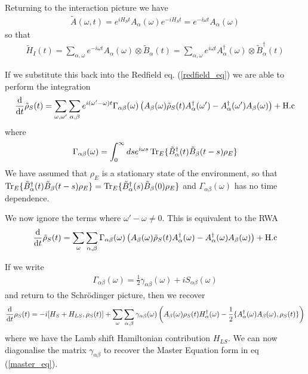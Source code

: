 Returning to the interaction picture we have
\begin{align}
  \tilde{A}(\omega, t) = e^{iH_S t}A_\alpha(\omega) e^{-iH_S t} = e^{-i\omega t} A_\alpha(\omega)
\end{align}
so that
\begin{align}
  \tilde{H}_I(t) = \sum_{\alpha, \omega} e^{-i \omega t} A_\alpha(\omega)\otimes \tilde{B}_\alpha(t) = \sum_{\alpha, \omega} e^{i \omega t} A^\dagger_\alpha(\omega)\otimes \tilde{B}^\dagger_\alpha(t)
\end{align}

If we substitute this back into the Redfield eq. (\ref{redfield_eq}) we are able to perform the integration
\begin{align}
  \frac{\mathrm{d}}{\mathrm{d}t} \tilde{\rho}_S(t) = \sum_{\omega, \omega'} \sum_{\alpha, \beta} e^{i(\omega'-\omega)t} \Gamma_{\alpha\beta}(\omega)\left(A_\beta(\omega)\tilde{\rho}_S(t)A^\dagger_\alpha(\omega') - A^\dagger_\alpha(\omega')A_\beta(\omega)\right) + \text{H.c}
\end{align}
where
\begin{align}
  \Gamma_{\alpha\beta}(\omega) = \int_0^\infty ds e^{i\omega s} \operatorname{Tr}_E \{ \tilde{B}_\alpha^\dagger(t) \tilde{B}_\beta(t-s) \rho_E \}
\end{align}
We have assumed that $\rho_E$ is a stationary state of the environment, so that $\operatorname{Tr}_E \{\tilde{B}_\alpha^\dagger(t) \tilde{B}_\beta(t-s) \rho_E \} = \operatorname{Tr}_E \{\tilde{B}_\alpha^\dagger(s) \tilde{B}_\beta(0) \rho_E \}$ and $\Gamma_{\alpha\beta}(\omega)$ has no time dependence.


We now ignore the terms where $\omega' - \omega \neq 0$. This is equivalent to the RWA
\begin{align}
  \frac{\mathrm{d}}{\mathrm{d}t} \tilde{\rho}_S(t) = \sum_{\omega} \sum_{\alpha, \beta} \Gamma_{\alpha\beta}(\omega)\left(A_\beta(\omega)\tilde{\rho}_S(t)A^\dagger_\alpha(\omega) - A^\dagger_\alpha(\omega)A_\beta(\omega)\right) + \text{H.c}
\end{align}

If we write
\begin{align}
  \Gamma_{\alpha \beta}(\omega) = \frac{1}{2}\gamma_{\alpha\beta}(\omega) + i S_{\alpha\beta}(\omega)
\end{align}
and return to the Schr\"odinger picture, then we recover
\begin{align}
  \frac{\mathrm{d}}{\mathrm{d}t} \rho_S(t) = -i[H_S + H_{LS}, \rho_S(t) ] + \sum_\omega \sum_{\alpha, \beta} \gamma_{\alpha\beta}(\omega)\left(A_\beta(\omega)\rho_S(t)H_\alpha^\dagger(\omega) - \frac{1}{2}\{A^\dagger_\alpha(\omega)A_\beta(\omega), \rho_S(t)\} \right)
\end{align}
where we have the Lamb shift Hamiltonian contribution $H_{LS}$. We can now diagonalise the matrix $\gamma_{\alpha\beta}$ to recover the Master Equation form in eq (\ref{master_eq}).

